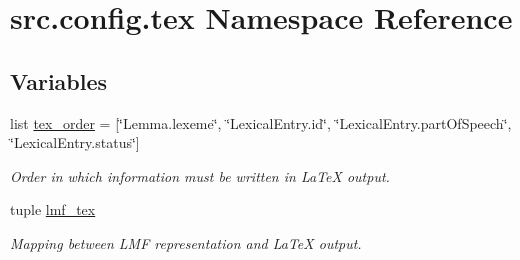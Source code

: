 \hypertarget{namespacesrc_1_1config_1_1tex}{\section{src.\+config.\+tex Namespace Reference}
\label{namespacesrc_1_1config_1_1tex}
}
\subsection*{Variables}
\begin{DoxyCompactItemize}
\item 
list \hyperlink{namespacesrc_1_1config_1_1tex_a11191ac7f2134958a9de8155e88af9a9}{tex\+\_\+order} = \mbox{[}\char`\"{}Lemma.\+lexeme\char`\"{}, \char`\"{}Lexical\+Entry.\+id\char`\"{}, \char`\"{}Lexical\+Entry.\+part\+Of\+Speech\char`\"{}, \char`\"{}Lexical\+Entry.\+status\char`\"{}\mbox{]}
\begin{DoxyCompactList}\small\item\em Order in which information must be written in La\+Te\+X output. \end{DoxyCompactList}\item 
tuple \hyperlink{namespacesrc_1_1config_1_1tex_ab73c6746f87c74d6f58c26f60a5f4d5e}{lmf\+\_\+tex}
\begin{DoxyCompactList}\small\item\em Mapping between L\+M\+F representation and La\+Te\+X output. \end{DoxyCompactList}\end{DoxyCompactItemize}



